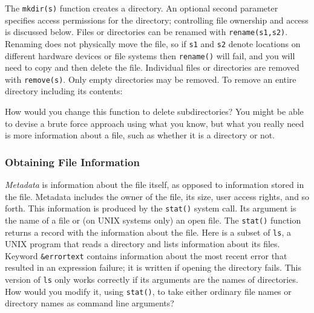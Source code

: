 The \texttt{mkdir(s)} function creates a directory. An
optional second parameter specifies access permissions for
the directory; controlling file ownership and access is discussed
below. Files or directories can be renamed with \texttt{rename(s1,s2)}.
Renaming does not physically move the file, so if \texttt{s1} and
\texttt{s2} denote locations on different hardware devices or file
systems then \texttt{rename()} will fail, and you will
need to {\textquotedbl}copy and then delete{\textquotedbl}
the file. Individual files or directories are removed with
\texttt{remove(s)}. Only empty directories may be
removed. To remove an entire directory including its contents:


How would you change this function to delete subdirectories? You might
be able to devise a brute force approach using what you know, but what
you really need is more information about a file, such as whether it is
a directory or not.

\subsubsection[Obtaining File Information]{Obtaining File Information}
\textit{Metadata} is information about the file
itself, as opposed to information stored in the file. Metadata includes
the owner of the file, its size, user access rights,
and so forth. This information is produced by the
\texttt{stat()} system call. Its argument is the name of
a file or (on UNIX systems only) an open file. The \texttt{stat()}
function returns a record with the information about the file. Here is
a subset of \texttt{ls}, a UNIX program that reads a directory and
lists information about its files. Keyword \texttt{\&errortext} contains information about the
most recent error that resulted in an expression
failure; it is written if opening the directory
fails. This version of \texttt{ls} only works correctly if its
arguments are the names of directories. How would you modify it, using
\texttt{stat()}, to take either ordinary file names or directory names
as command line arguments?

